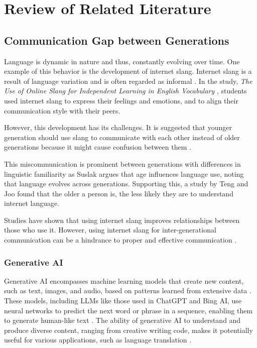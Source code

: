\chapter{Review of Related Literature}
\label{sec:relatedlit}

\section{Communication Gap between Generations}
Language is dynamic in nature and thus, constantly evolving over time. One example of this behavior is the development of internet slang. Internet slang is a result of language variation and is often regarded as informal \cite{Liu_Gui_Zuo_Dai_2019}. In the study, \textit{The Use of Online Slang for Independent Learning in English Vocabulary} \cite{Ambarsari_Amrullah_Nawawi_2020}, students used internet slang to express their feelings and emotions, and to align their communication style with their peers. 

However, this development has its challenges. It is suggested that younger generation should use slang to communicate with each other instead of older generations because it might cause confusion between them \cite{Jeresano_Carretero_2022}.

This miscommunication is prominent between generations with differences in linguistic familiarity as Suslak \cite{SUSLAK2009199} argues that age influences language use, noting that language evolves across generations.
Supporting this, a study by Teng and Joo \cite{Teng_Joo2023} found that the older a person is, the less likely they are to understand internet language.

Studies have shown that using internet slang improves relationships between those who use it. However, using internet slang for inter-generational communication can be a hindrance to proper and effective communication \cite{gonzagaforda}.

\subsection{Generative AI}
Generative AI encompasses machine learning models that create new content, such as text, images, and audio, based on patterns learned from extensive data \cite{euchner2023generative}. These models, including LLMs like those used in ChatGPT and Bing AI, use neural networks to predict the next word or phrase in a sequence, enabling them to generate human-like text \cite{brynjolfsson2023generative}. The ability of generative AI to understand and produce diverse content, ranging from creative writing code, makes it potentially useful for various applications, such as language translation \cite{fui2023generative}. 

